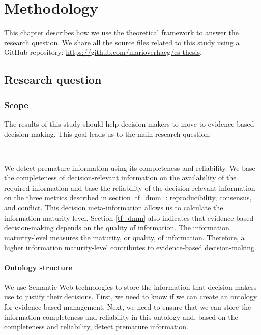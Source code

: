 \section{Methodology} \label{methodology}
This chapter describes how we use the theoretical framework to answer the research question. We share all the source files related to this study using a GitHub repository: \href{https://github.com/marioverhaeg/cs-thesis}{https://github.com/marioverhaeg/cs-thesis}.

\subsection{Research question} \label{meth_scope}
\subsubsection{Scope}
The results of this study should help decision-makers to move to evidence-based decision-making. This goal leads us to the main research question:
\begin{center}
\large\color{document}{\researchquestion} \\
\end{center}

We detect premature information using its completeness and reliability. We base the completeness of decision-relevant information on the availability of the required information and base the reliability of the decision-relevant information on the three metrics described in section \ref{tf_dmm} : reproducibility, consensus, and conflict. This decision meta-information allows us to calculate the information maturity-level. Section \ref{tf_dmm}  also indicates that evidence-based decision-making depends on the quality of information. The information maturity-level measures the maturity, or quality, of information. Therefore, a higher information maturity-level contributes to evidence-based decision-making.

\paragraph{Ontology structure}
We use Semantic Web technologies to store the information that decision-makers use to justify their decisions. First, we need to know if we can create an ontology for evidence-based management. Next, we need to ensure that we can store the information completeness and reliability in this ontology and, based on the completeness and reliability, detect premature information. 

